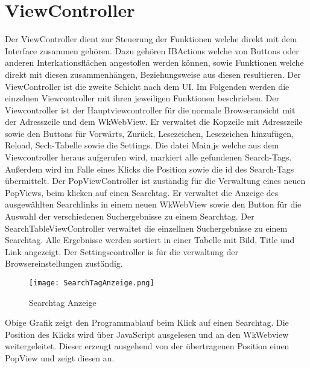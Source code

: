 
\section{ViewController}
Der ViewController dient zur Steuerung der Funktionen welche direkt mit dem Interface zusammen gehören. Dazu gehören
IBActions welche von Buttons oder anderen Interkationsflächen angestoßen werden können, sowie Funktionen welche direkt mit diesen zusammenhängen, Beziehungsweise aus diesen resultieren. Der ViewController ist die zweite Schicht nach dem UI. Im
Folgenden werden die einzelnen Viewcontroller mit ihren jeweiligen Funktionen beschrieben.
Der Viewcontroller ist der Hauptviewcontroller für die normale Browseransicht mit der Adresszeile und dem WkWebView. Er verwaltet die Kopzeile mit Adresszeile sowie den Buttons für Vorwärts, Zurück, Lesezeichen, Lesezeichen hinzufügen, Reload, Sech-Tabelle sowie die Settings. Die datei Main.js welche aus dem Viewcontroller heraus aufgerufen wird, markiert alle gefundenen Search-Tags. Außerdem wird im Falle eines Klicks die Position sowie die id des Search-Tags übermittelt.
Der PopViewController ist zuständig für die Verwaltung eines neuen PopViews, beim klicken auf einen Searchtag. Er verwaltet die Anzeige des ausgewählten Searchlinks in einem neuen WkWebView sowie den Button für die Auswahl der verschiedenen Suchergebnisse zu einem Searchtag.
Der SearchTableViewController verwaltet die einzellnen Suchergebnisse zu einem Searchtag. Alle Ergebnisse werden sortiert in einer Tabelle mit Bild, Title und Link angezeigt.
Der Settingscontroller is für die verwaltung der Browsereinstellungen zuständig.

\begin{figure}[ht]
	\centering
	\texttt{[image: SearchTagAnzeige.png]}
	\caption{Searchtag Anzeige}
	\label{fig:Searchtag Anzeige}
\end{figure}

Obige Grafik zeigt den Programmablauf beim Klick auf einen Searchtag. Die Position des Klicks wird über JavaScript ausgelesen und an den WkWebview weitergeleitet. Dieser erzeugt ausgehend von der übertragenen Position einen PopView und zeigt diesen an. 


